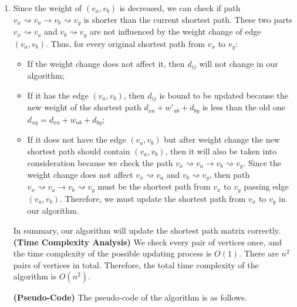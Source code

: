\documentclass[12pt,a4paper]{article}
\makeatletter
\newtheorem*{solution}{Solution}
\theoremstyle{definition}
\renewenvironment{solution}[1][Solution] {\par\pushQED{\qed}\normalfont\topsep6\p@\@plus6\p@\relax\trivlist\item[\hskip\labelsep\bfseries#1\@addpunct{.}]\ignorespaces}{\popQED\endtrivlist\@endpefalse} \makeatother
\makeatother
\begin{document}
\begin{enumerate}
\begin{solution}
        Since the weight of $(v_a, v_b)$ is decreased, we can check if path $v_x \rightsquigarrow v_a \rightarrow v_b \rightsquigarrow v_y$ is shorter than the current shortest path. These two parts $v_x \rightsquigarrow v_a$ and $v_b \rightsquigarrow v_y$ are not influenced by the weight change of edge $(v_a, v_b)$.
        Thus, for every original shortest path from $v_x$ to $v_y$:
        \begin{itemize}
        \item If the weight change does not affect it, then $d_{ij}$ will not change in our algorithm;
        \item If it has the edge $(v_a, v_b)$, then $d_{ij}$ is bound to be updated because the new weight of the shortest path $d_{xa} + w'_{ab} + d_{by}$ is less than the old one $d_{xy} = d_{xa} + w_{ab} + d_{by}$;
        \item If it does not have the edge $(v_a, v_b)$ but after weight change the new shortest path should contain $(v_a, v_b)$, then it will also be taken into consideration because we check the path $v_x \rightsquigarrow v_a \rightarrow v_b \rightsquigarrow v_y$. Since the weight change does not affect $v_x \rightsquigarrow v_a$ and $v_b \rightsquigarrow v_y$, then path $v_x \rightsquigarrow v_a \rightarrow v_b \rightsquigarrow v_y$ must be the shortest path from $v_x$ to $v_y$ passing edge $(v_a, v_b)$. Therefore, we must update the shortest path from $v_x$ to $v_y$ in our algorithm.
        \end{itemize}

        In summary, our algorithm will update the shortest path matrix correctly.
        \clearpage
        \textbf{(Time Complexity Analysis)} We check every pair of vertices once, and the time complexity of the possible updating process is $O(1)$. There are $n^2$ pairs of vertices in total. Therefore, the total time complexity of the algorithm is $O(n^2)$.

        \textbf{(Pseudo-Code)} The pseudo-code of the algorithm is as follows.
        \begin{center}
        \begin{minipage}[t]{0.8\textwidth}
        \begin{algorithm}[H]


\end{algorithm}
\end{minipage}
\end{center}
\end{solution}
\end{enumerate}
\end{document}
